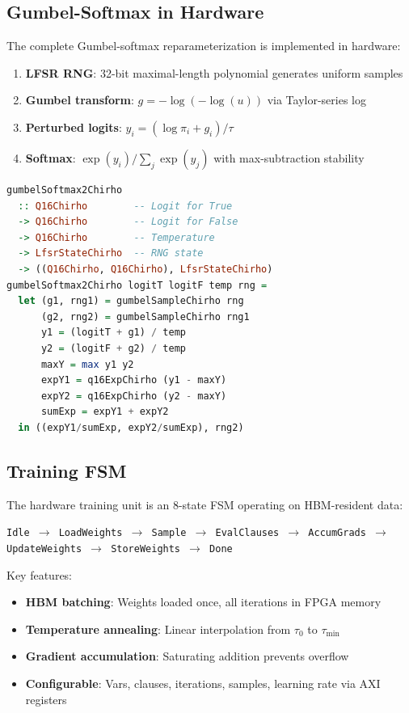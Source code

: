 \documentclass[11pt,a4paper]{article}
\begin{document}
\subsection{Gumbel-Softmax in Hardware}
\label{subsec:gumbel_hw_chirho}

The complete Gumbel-softmax reparameterization is implemented in hardware:

\begin{enumerate}
  \item \textbf{LFSR RNG}: 32-bit maximal-length polynomial generates uniform samples
  \item \textbf{Gumbel transform}: $g = -\log(-\log(u))$ via Taylor-series log
  \item \textbf{Perturbed logits}: $y_i = (\log \pi_i + g_i) / \tau$
  \item \textbf{Softmax}: $\exp(y_i) / \sum_j \exp(y_j)$ with max-subtraction stability
\end{enumerate}

\begin{lstlisting}[language=Haskell,caption={Gumbel-softmax for binary variables}]
gumbelSoftmax2Chirho
  :: Q16Chirho        -- Logit for True
  -> Q16Chirho        -- Logit for False
  -> Q16Chirho        -- Temperature
  -> LfsrStateChirho  -- RNG state
  -> ((Q16Chirho, Q16Chirho), LfsrStateChirho)
gumbelSoftmax2Chirho logitT logitF temp rng =
  let (g1, rng1) = gumbelSampleChirho rng
      (g2, rng2) = gumbelSampleChirho rng1
      y1 = (logitT + g1) / temp
      y2 = (logitF + g2) / temp
      maxY = max y1 y2
      expY1 = q16ExpChirho (y1 - maxY)
      expY2 = q16ExpChirho (y2 - maxY)
      sumExp = expY1 + expY2
  in ((expY1/sumExp, expY2/sumExp), rng2)
\end{lstlisting}

\subsection{Training FSM}
\label{subsec:training_fsm_chirho}

The hardware training unit is an 8-state FSM operating on HBM-resident data:

\begin{center}
\texttt{Idle $\to$ LoadWeights $\to$ Sample $\to$ EvalClauses $\to$ AccumGrads $\to$ UpdateWeights $\to$ StoreWeights $\to$ Done}
\end{center}

Key features:
\begin{itemize}
  \item \textbf{HBM batching}: Weights loaded once, all iterations in FPGA memory
  \item \textbf{Temperature annealing}: Linear interpolation from $\tau_0$ to $\tau_{\min}$
  \item \textbf{Gradient accumulation}: Saturating addition prevents overflow
  \item \textbf{Configurable}: Vars, clauses, iterations, samples, learning rate via AXI registers
\end{itemize}
\end{document}
